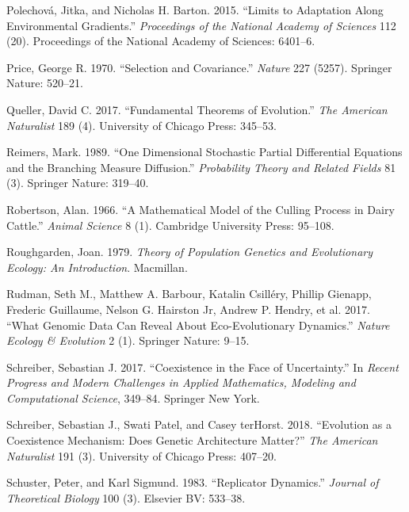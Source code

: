 \documentclass[]{article}
\begin{document}
\leavevmode\hypertarget{ref-Polechov2015}{}%
Polechová, Jitka, and Nicholas H. Barton. 2015. ``Limits to Adaptation
Along Environmental Gradients.'' \emph{Proceedings of the National
Academy of Sciences} 112 (20). Proceedings of the National Academy of
Sciences: 6401--6.

\leavevmode\hypertarget{ref-PRICE1970}{}%
Price, George R. 1970. ``Selection and Covariance.'' \emph{Nature} 227
(5257). Springer Nature: 520--21.

\leavevmode\hypertarget{ref-Queller2017}{}%
Queller, David C. 2017. ``Fundamental Theorems of Evolution.'' \emph{The
American Naturalist} 189 (4). University of Chicago Press: 345--53.

\leavevmode\hypertarget{ref-Reimers1989}{}%
Reimers, Mark. 1989. ``One Dimensional Stochastic Partial Differential
Equations and the Branching Measure Diffusion.'' \emph{Probability
Theory and Related Fields} 81 (3). Springer Nature: 319--40.

\leavevmode\hypertarget{ref-Robertson1966}{}%
Robertson, Alan. 1966. ``A Mathematical Model of the Culling Process in
Dairy Cattle.'' \emph{Animal Science} 8 (1). Cambridge University Press:
95--108.

\leavevmode\hypertarget{ref-joanroughgarden1979}{}%
Roughgarden, Joan. 1979. \emph{Theory of Population Genetics and
Evolutionary Ecology: An Introduction}. Macmillan.

\leavevmode\hypertarget{ref-Rudman2017}{}%
Rudman, Seth M., Matthew A. Barbour, Katalin Csilléry, Phillip Gienapp,
Frederic Guillaume, Nelson G. Hairston Jr, Andrew P. Hendry, et al.
2017. ``What Genomic Data Can Reveal About Eco-Evolutionary Dynamics.''
\emph{Nature Ecology \& Evolution} 2 (1). Springer Nature: 9--15.

\leavevmode\hypertarget{ref-Schreiber2017}{}%
Schreiber, Sebastian J. 2017. ``Coexistence in the Face of
Uncertainty.'' In \emph{Recent Progress and Modern Challenges in Applied
Mathematics, Modeling and Computational Science}, 349--84. Springer New
York.

\leavevmode\hypertarget{ref-Schreiber2018}{}%
Schreiber, Sebastian J., Swati Patel, and Casey terHorst. 2018.
``Evolution as a Coexistence Mechanism: Does Genetic Architecture
Matter?'' \emph{The American Naturalist} 191 (3). University of Chicago
Press: 407--20.

\leavevmode\hypertarget{ref-Schuster1983}{}%
Schuster, Peter, and Karl Sigmund. 1983. ``Replicator Dynamics.''
\emph{Journal of Theoretical Biology} 100 (3). Elsevier BV: 533--38.
\end{document}
